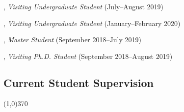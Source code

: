 \documentclass[10pt]{article}
\newenvironment{myindentpar}[1]%
{\begin{list}{}%
         {\setlength{\leftmargin}{#1}}%
         \item[]%
}
{\end{list}}
\newcounter{list}
\begin{document}
\begin{myindentpar}{0.75cm}
\hspace{-0.75cm}{\bf Yang Zhou}, \emph{Visiting Undergraduate Student} (July--August 2019)

\hspace{-0.75cm}{\bf Jiajun Huang}, \emph{Visiting Undergraduate Student} (January--February 2020)

\hspace{-0.75cm}{\bf Yifan Ding}, \emph{Master Student} (September 2018--July 2019)

\hspace{-0.75cm}{\bf Tianwen Jiang}, \emph{Visiting Ph.D. Student} (September 2018--August 2019)

\end{myindentpar}

\subsection{\sc Current Student Supervision}
\vspace{-0.4cm} \line(1,0){370} \vspace{-0.1cm}
\end{document}
